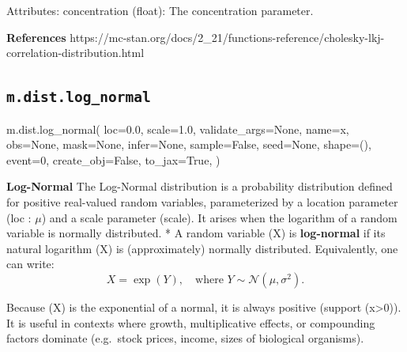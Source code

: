 \documentclass[
  letterpaper,
  DIV=11,
  numbers=noendperiod]{scrartcl}
\newenvironment{Shaded}{\begin{snugshade}}{\end{snugshade}}
\newcommand{\DecValTok}[1]{\textcolor[rgb]{0.68,0.00,0.00}{#1}}
\newcommand{\FloatTok}[1]{\textcolor[rgb]{0.68,0.00,0.00}{#1}}
\newcommand{\NormalTok}[1]{\textcolor[rgb]{0.00,0.23,0.31}{#1}}
\newcommand{\OperatorTok}[1]{\textcolor[rgb]{0.37,0.37,0.37}{#1}}
\newcommand{\StringTok}[1]{\textcolor[rgb]{0.13,0.47,0.30}{#1}}
\newcommand{\VariableTok}[1]{\textcolor[rgb]{0.07,0.07,0.07}{#1}}
\begin{document}
\begin{itemize}
  Attributes: concentration (float): The concentration parameter.
\end{itemize}

\textbf{References}
https://mc-stan.org/docs/2\_21/functions-reference/cholesky-lkj-correlation-distribution.html

\subsection{\texorpdfstring{\texttt{m.dist.log\_normal}}{m.dist.log\_normal}}\label{log_normal}

\begin{Shaded}
\begin{Highlighting}[]
\NormalTok{m.dist.log\_normal(}
\NormalTok{    loc}\OperatorTok{=}\FloatTok{0.0}\NormalTok{,}
\NormalTok{    scale}\OperatorTok{=}\FloatTok{1.0}\NormalTok{,}
\NormalTok{    validate\_args}\OperatorTok{=}\VariableTok{None}\NormalTok{,}
\NormalTok{    name}\OperatorTok{=}\StringTok{\textquotesingle{}x\textquotesingle{}}\NormalTok{,}
\NormalTok{    obs}\OperatorTok{=}\VariableTok{None}\NormalTok{,}
\NormalTok{    mask}\OperatorTok{=}\VariableTok{None}\NormalTok{,}
\NormalTok{    infer}\OperatorTok{=}\VariableTok{None}\NormalTok{,}
\NormalTok{    sample}\OperatorTok{=}\VariableTok{False}\NormalTok{,}
\NormalTok{    seed}\OperatorTok{=}\VariableTok{None}\NormalTok{,}
\NormalTok{    shape}\OperatorTok{=}\NormalTok{(),}
\NormalTok{    event}\OperatorTok{=}\DecValTok{0}\NormalTok{,}
\NormalTok{    create\_obj}\OperatorTok{=}\VariableTok{False}\NormalTok{,}
\NormalTok{    to\_jax}\OperatorTok{=}\VariableTok{True}\NormalTok{,}
\NormalTok{)}
\end{Highlighting}
\end{Shaded}

\textbf{Log-Normal} The Log-Normal distribution is a probability
distribution defined for positive real-valued random variables,
parameterized by a location parameter (loc : \(\mu\)) and a scale
parameter (scale). It arises when the logarithm of a random variable is
normally distributed. * A random variable (X) is \textbf{log-normal} if
its natural logarithm (\ln X) is (approximately) normally distributed.
Equivalently, one can write: \[
X = \exp(Y), \quad \text{where } Y \sim \mathcal{N}(\mu, \sigma^2).
\]

Because (X) is the exponential of a normal, it is always positive
(support (x\textgreater0)). It is useful in contexts where growth,
multiplicative effects, or compounding factors dominate (e.g.~stock
prices, income, sizes of biological organisms).
\end{document}
